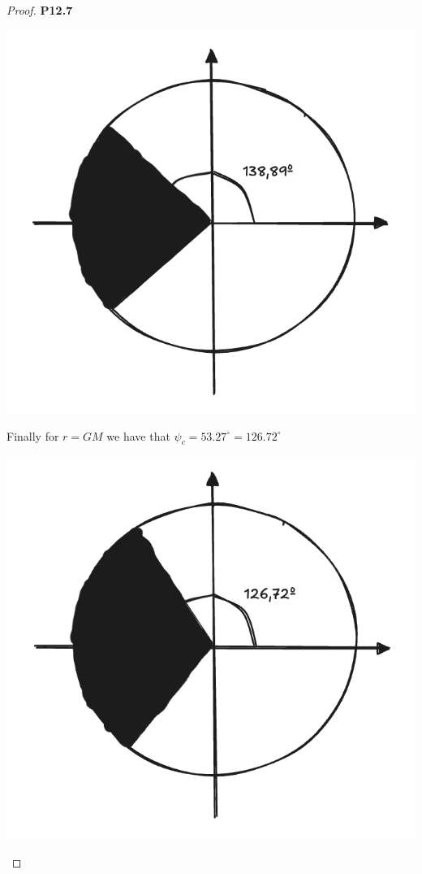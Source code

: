 \documentclass[11pt]{article}
\theoremstyle{definition}
\begin{document}
\begin{proof}{\textbf{P12.7}}
\begin{itemize}
\begin{center}
        \includegraphics[scale=0.3]{ch12-p12.7-iii.png}
    \end{center}
    Finally for $r = GM$ we have that $\psi_c = 53.27^\circ = 126.72^\circ$
    \begin{center}
        \includegraphics[scale=0.3]{ch12-p12.7-iv.png}
    \end{center}

\end{itemize}
\end{proof}
\end{document}
